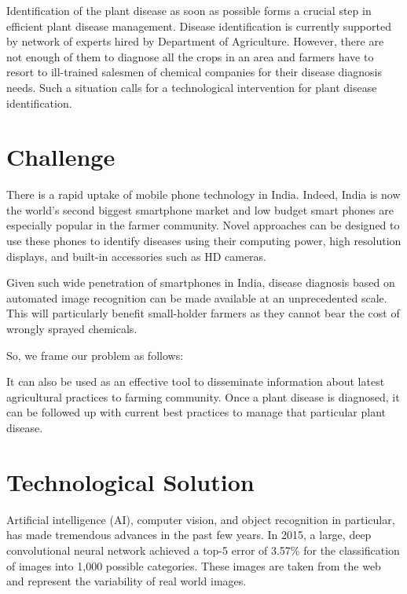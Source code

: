 \documentclass[a4paper]{scrartcl}
\begin{document}
Identification of the plant disease as soon as possible forms a crucial step in efficient plant disease management. 
Disease identification is currently supported by network of experts hired by Department of Agriculture. 
However, there are not enough of them to diagnose all the crops in an area and
farmers have to resort to ill-trained salesmen of chemical companies for their disease diagnosis needs.
Such a situation calls for a technological intervention for plant disease identification.

\section{Challenge}
There is a rapid uptake of mobile phone technology in India. Indeed, India is now the world's second biggest smartphone market and low budget smart phones are especially popular in the farmer community.  
Novel approaches can be designed to use these phones to identify diseases using their computing power, high resolution displays, and built-in accessories such as HD cameras.

Given such wide penetration of smartphones in India, disease diagnosis based on automated image recognition can be made available at an unprecedented scale. 
This will particularly benefit small-holder farmers as they cannot bear the cost of wrongly sprayed chemicals. 

So, we frame our problem as follows:  
\begin{center}
\end{center}
It can also be used as an effective tool to disseminate information about latest agricultural practices to farming community. Once a plant disease is diagnosed, it can be followed up with current best practices to manage that particular plant disease. 

\section{Technological Solution}

Artificial intelligence (AI), computer vision, and object recognition in particular, has made tremendous advances in the past few years. In 2015, a large, deep convolutional neural network achieved a top-5 error of 3.57\% for the classification of images into 1,000 possible categories\cite{DBLP:journals/corr/HeZRS15}.
These images are taken from the web and represent the variability of real world images.
\end{document}
